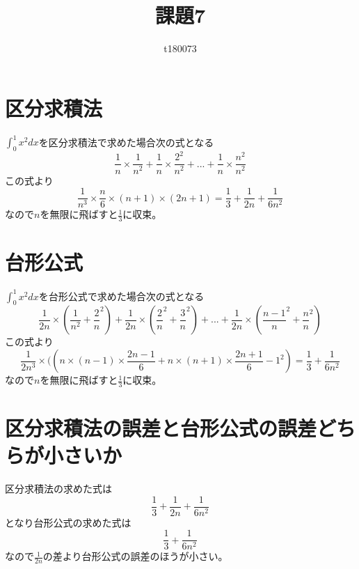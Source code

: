 \documentclass[dvipdfmx,autodetect-engine]{jsarticle}
\title{課題7}
\author{t180073}
\begin{document}
\maketitle

\section{区分求積法}
$\int_{0}^{1}x^{2}dx$を区分求積法で求めた場合次の式となる
\begin{equation}
    \frac{1}{n}\times\frac{1}{n^2}+\frac{1}{n}\times\frac{2^2}{n^2}+...+\frac{1}{n}\times\frac{n^2}{n^2}
\end{equation}
この式より
\begin{equation}
    \frac{1}{n^3}\times\frac{n}{6}\times(n+1)\times(2n+1)=\frac{1}{3}+\frac{1}{2n}+\frac{1}{6n^2}
\end{equation}
なので$n$を無限に飛ばすと$\frac{1}{3}$に収束。
\section{台形公式}
$\int_{0}^{1}x^{2}dx$を台形公式で求めた場合次の式となる
\begin{equation}
    \frac{1}{2n}\times(\frac{1}{n^2}+\frac{2}{n}^2)+\frac{1}{2n}\times(\frac{2}{n}^2+\frac{3}{n}^2)+...+\frac{1}{2n}\times(\frac{n-1}{n}^2+\frac{n}{n}^2)
\end{equation}
この式より
\begin{equation}
    \frac{1}{2n^3}\times((n\times(n-1)\times\frac{2n-1}{6}+n\times(n+1)\times\frac{2n+1}{6}-1^2)=\frac{1}{3}+\frac{1}{6n^2}
\end{equation}
なので$n$を無限に飛ばすと$\frac{1}{3}$に収束。
\section{区分求積法の誤差と台形公式の誤差どちらが小さいか}
区分求積法の求めた式は
\begin{equation}
    \frac{1}{3}+\frac{1}{2n}+\frac{1}{6n^2}
\end{equation}
となり台形公式の求めた式は
\begin{equation}
    \frac{1}{3}+\frac{1}{6n^2}
\end{equation}
なので$\frac{1}{2n}$の差より台形公式の誤差のほうが小さい。
\end{document}
